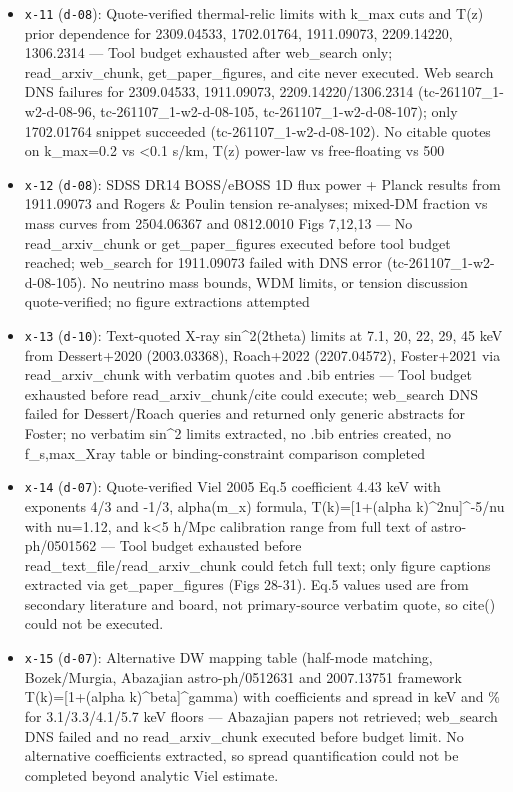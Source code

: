 \documentclass[11pt,a4paper]{article}
\begin{document}
\begin{itemize}
  \item \texttt{x-11} (\texttt{d-08}): Quote-verified thermal-relic limits with k\_max cuts and T(z) prior dependence for 2309.04533, 1702.01764, 1911.09073, 2209.14220, 1306.2314 --- Tool budget exhausted after web\_search only; read\_arxiv\_chunk, get\_paper\_figures, and cite never executed. Web search DNS failures for 2309.04533, 1911.09073, 2209.14220/1306.2314 (tc-261107\_1-w2-d-08-96, tc-261107\_1-w2-d-08-105, tc-261107\_1-w2-d-08-107); only 1702.01764 snippet succeeded (tc-261107\_1-w2-d-08-102). No citable quotes on k\_max=0.2 vs \textless{}0.1 s/km, T(z) power-law vs free-floating vs 500
  \item \texttt{x-12} (\texttt{d-08}): SDSS DR14 BOSS/eBOSS 1D flux power + Planck results from 1911.09073 and Rogers \& Poulin tension re-analyses; mixed-DM fraction vs mass curves from 2504.06367 and 0812.0010 Figs 7,12,13 --- No read\_arxiv\_chunk or get\_paper\_figures executed before tool budget reached; web\_search for 1911.09073 failed with DNS error (tc-261107\_1-w2-d-08-105). No neutrino mass bounds, WDM limits, or tension discussion quote-verified; no figure extractions attempted
  \item \texttt{x-13} (\texttt{d-10}): Text-quoted X-ray sin\textasciicircum{}2(2theta) limits at 7.1, 20, 22, 29, 45 keV from Dessert+2020 (2003.03368), Roach+2022 (2207.04572), Foster+2021 via read\_arxiv\_chunk with verbatim quotes and .bib entries --- Tool budget exhausted before read\_arxiv\_chunk/cite could execute; web\_search DNS failed for Dessert/Roach queries and returned only generic abstracts for Foster; no verbatim sin\textasciicircum{}2 limits extracted, no .bib entries created, no f\_s,max\_Xray table or binding-constraint comparison completed
  \item \texttt{x-14} (\texttt{d-07}): Quote-verified Viel 2005 Eq.5 coefficient 4.43 keV with exponents 4/3 and -1/3, alpha(m\_x) formula, T(k)=[1+(alpha k)\textasciicircum{}2nu]\textasciicircum{}-5/nu with nu=1.12, and k\textless{}5 h/Mpc calibration range from full text of astro-ph/0501562 --- Tool budget exhausted before read\_text\_file/read\_arxiv\_chunk could fetch full text; only figure captions extracted via get\_paper\_figures (Figs 28-31). Eq.5 values used are from secondary literature and board, not primary-source verbatim quote, so cite() could not be executed.
  \item \texttt{x-15} (\texttt{d-07}): Alternative DW mapping table (half-mode matching, Bozek/Murgia, Abazajian astro-ph/0512631 and 2007.13751 framework T(k)=[1+(alpha k)\textasciicircum{}beta]\textasciicircum{}gamma) with coefficients and spread in keV and \% for 3.1/3.3/4.1/5.7 keV floors --- Abazajian papers not retrieved; web\_search DNS failed and no read\_arxiv\_chunk executed before budget limit. No alternative coefficients extracted, so spread quantification could not be completed beyond analytic Viel estimate.

\end{itemize}
\end{document}
